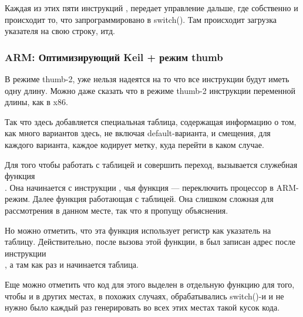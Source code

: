 Каждая из этих пяти инструкций , передает управление дальше, где собственно и происходит то, 
что запрограммировано в switch(). Там происходит загрузка указателя на свою строку, итд.

\subsubsection{ARM: Оптимизирующий Keil + режим thumb}



В режиме thumb-2, уже нельзя надеятся на то что все инструкции будут иметь одну длину. 
Можно даже сказать что в режиме thumb-2 инструкции переменной длины, как в x86.

Так что здесь добавляется специальная таблица, содержащая информацию о том, как много вариантов здесь,
не включая default-варианта, и смещения, для каждого варианта, каждое кодирует метку, куда перейти в 
каком случае.

Для того чтобы работать с таблицей и совершить переход, вызывается служебная функция \\
. Она начинается с инструкции , чья функция --- 
переключить процессор в ARM-режим. Далее функция работающая с таблицей. Она слишком сложная для 
рассмотрения в данном месте, так что я пропущу объяснения. 

Но можно отметить, что эта функция использует
регистр \LR как указатель на таблицу. Действительно, после вызова этой функции, в \LR был записан
адрес после инструкции \\ 
, а там как раз и начинается таблица.

Еще можно отметить что код для этого выделен в отдельную функцию для того, чтобы и в других местах,
в похожих случаях, обрабатывались switch()-и и не нужно было каждый раз генерировать во всех этих
местах такой кусок кода.

